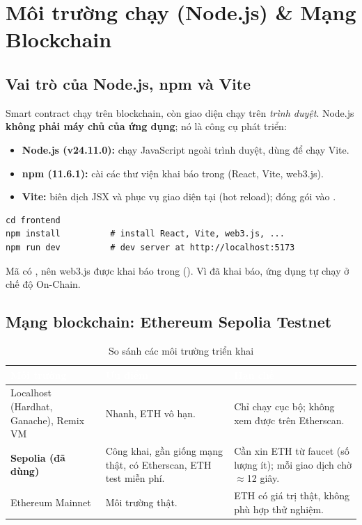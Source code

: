 \section{Môi trường chạy (Node.js) \& Mạng Blockchain}
\label{sec:ch6}

\subsection{Vai trò của Node.js, npm và Vite}

Smart contract chạy trên blockchain, còn giao diện chạy trên \emph{trình duyệt}. Node.js \textbf{không phải máy chủ của ứng dụng}; nó là công cụ phát triển:

\begin{itemize}[leftmargin=1.5em]
    \item \textbf{Node.js (v24.11.0):} chạy JavaScript ngoài trình duyệt, dùng để chạy Vite.
    \item \textbf{npm (11.6.1):} cài các thư viện khai báo trong  (React, Vite, web3.js).
    \item \textbf{Vite:}  biên dịch JSX và phục vụ giao diện tại  (hot reload);
           đóng gói vào .
\end{itemize}

\begin{lstlisting}[style=ShellStyle, caption={Cài đặt và chạy frontend}]
cd frontend
npm install          # install React, Vite, web3.js, ...
npm run dev          # dev server at http://localhost:5173
\end{lstlisting}

Mã có , nên web3.js được khai báo trong  ().
Vì  đã khai báo, ứng dụng tự chạy ở chế độ On-Chain.

\subsection{Mạng blockchain: Ethereum Sepolia Testnet}

\begin{table}[H]
\centering
\caption{So sánh các môi trường triển khai}
\begin{tabularx}{\linewidth}{|l|X|X|}
\hline
\rowcolor{navyblue}\textcolor{white}{\textbf{Môi trường}} & \textcolor{white}{\textbf{Ưu điểm}} & \textcolor{white}{\textbf{Hạn chế}} \\
\hline
Localhost (Hardhat, Ganache), Remix VM & Nhanh, ETH vô hạn. & Chỉ chạy cục bộ; không xem được trên Etherscan. \\
\hline
\rowcolor{rowgray}
\textbf{Sepolia (đã dùng)} & Công khai, gần giống mạng thật, có Etherscan, ETH test miễn phí. & Cần xin ETH từ faucet (số lượng ít); mỗi giao dịch chờ $\approx$12 giây. \\
\hline
Ethereum Mainnet & Môi trường thật. & ETH có giá trị thật, không phù hợp thử nghiệm. \\
\hline
\end{tabularx}
\end{table}


